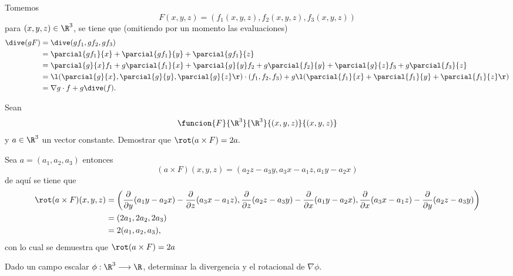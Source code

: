 \documentclass[a4,11pt]{aleph-examen}
\begin{document}
\begin{preguntas}
\begin{respuesta}
\begin{respuesta}
\begin{respuesta}
    Tomemos 
    \[
        F(x,y,z) = (f_1(x,y,z),f_2(x,y,z),f_3(x,y,z)) 
    \]
    para $(x,y,z)\in\R^3$, se tiene que (omitiendo por un momento las evaluaciones)
    \begin{align*}
        \dive(gF) & = \dive(gf_1,gf_2,gf_3) \\
            & = \parcial{gf_1}{x} + \parcial{gf_1}{y} + \parcial{gf_1}{z} \\
            & = \parcial{g}{x} f_1 + g\parcial{f_1}{x} 
            + \parcial{g}{y} f_2 + g\parcial{f_2}{y} 
            + \parcial{g}{z} f_3 + g\parcial{f_3}{z} \\
            & = \l( \parcial{g}{x},\parcial{g}{y},\parcial{g}{z} \r) \cdot (f_1,f_2,f_3) + g\l(\parcial{f_1}{x} +\parcial{f_1}{y} +\parcial{f_1}{z} \r)\\
            & = \nabla g\cdot f + g\dive(f).
    \end{align*}
\end{respuesta}

\item
    Sean
    \[
        \funcion{F}{\R^3}{\R^3}{(x,y,z)}{(x,y,z)}
    \]
    y $a \in \R^3$ un vector constante. Demostrar que $\rot(a \times F)=2a.$

\begin{respuesta}
    Sea $a=(a_1,a_2,a_3)$ entonces
    \[
        (a \times F){(x,y,z)}=(a_2z-a_3y ,a_3 x-a_1z, a_1y-a_2x)
    \]
    de aquí se tiene que 
    \begin{align*}
        \rot(a \times F)(x,y,z)
            &=\left( \frac{\partial}{\partial y} (a_1y-a_2x)-\frac{\partial}{\partial z}(a_3 x-a_1z),\frac{\partial}{\partial z} (a_2z-a_3y)-\frac{\partial}{\partial x}(a_1y-a_2x),\frac{\partial}{\partial x} (a_3 x-a_1z)-\frac{\partial}{\partial y}(a_2z-a_3y) \right)\\
            &=(2a_1,2a_2,2a_3)\\
            &=2(a_1,a_2,a_3),
    \end{align*}
    con lo cual se demuestra que $\rot(a \times F)=2a$
\end{respuesta}

\item
    Dado un campo escalar $\phi:\R^3 \longrightarrow \R$, determinar la divergencia y el rotacional de $\nabla \phi$.
    

\end{respuesta}
\end{respuesta}
\end{preguntas}
\end{document}
